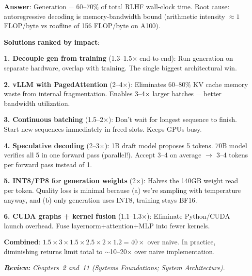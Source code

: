 \begin{questionbox}
\textbf{Answer}: Generation = 60--70\% of total RLHF wall-clock time. Root cause: autoregressive decoding is memory-bandwidth bound (arithmetic intensity $\approx 1$ FLOP/byte vs roofline of 156 FLOP/byte on A100).

\textbf{Solutions ranked by impact}:

\textbf{1. Decouple gen from training} (1.3--1.5$\times$ end-to-end): Run generation on separate hardware, overlap with training. The single biggest architectural win.

\textbf{2. vLLM with PagedAttention} (2--4$\times$): Eliminates 60--80\% KV cache memory waste from internal fragmentation. Enables 3--4$\times$ larger batches = better bandwidth utilization.

\textbf{3. Continuous batching} (1.5--2$\times$): Don’t wait for longest sequence to finish. Start new sequences immediately in freed slots. Keeps GPUs busy.

\textbf{4. Speculative decoding} (2--3$\times$): 1B draft model proposes 5 tokens. 70B model verifies all 5 in one forward pass (parallel!). Accept 3--4 on average $\rightarrow$ 3--4 tokens per forward pass instead of 1.

\textbf{5. INT8/FP8 for generation weights} (2$\times$): Halves the 140GB weight read per token. Quality loss is minimal because (a) we’re sampling with temperature anyway, and (b) only generation uses INT8, training stays BF16.

\textbf{6. CUDA graphs + kernel fusion} (1.1--1.3$\times$): Eliminate Python/CUDA launch overhead. Fuse layernorm+attention+MLP into fewer kernels.

\textbf{Combined}: $1.5 \times 3 \times 1.5 \times 2.5 \times 2 \times 1.2 = 40\times$ over naive. In practice, diminishing returns limit total to $\sim$10--20$\times$ over naive implementation.

\emph{\textbf{Review:} Chapters~2 and~11 (Systems Foundations; System Architecture).}
\end{questionbox}

